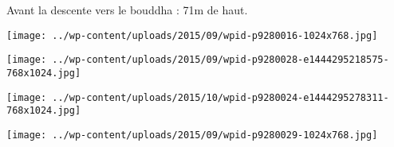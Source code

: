 \pagebreak
 Avant la descente vers le bouddha : 71m de haut. 
\begin{center} \texttt{[image: ../wp-content/uploads/2015/09/wpid-p9280016-1024x768.jpg]} \end{center}
\begin{center} \texttt{[image: ../wp-content/uploads/2015/09/wpid-p9280028-e1444295218575-768x1024.jpg]} \end{center} 
\begin{center} \texttt{[image: ../wp-content/uploads/2015/10/wpid-p9280024-e1444295278311-768x1024.jpg]} \end{center}
\begin{center} \texttt{[image: ../wp-content/uploads/2015/09/wpid-p9280029-1024x768.jpg]} \end{center}
